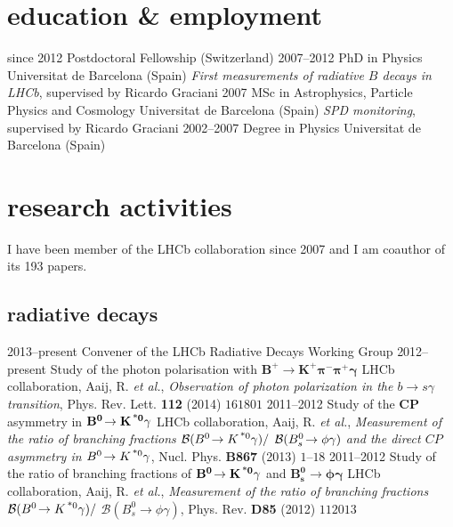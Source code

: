 \section{education \& employment}

  \cventry
    {since 2012}
    {Postdoctoral Fellowship}
    {\epfl(Switzerland)}
    {}
  \cventry
    {2007--2012}
    {PhD in Physics}
    {Universitat de Barcelona (Spain)}
    {\emph{First measurements of radiative $B$ decays in LHCb}, supervised by Ricardo Graciani}
  \cventry
    {2007}
    {MSc in Astrophysics, Particle Physics and Cosmology}
    {Universitat de Barcelona (Spain)}
    {\emph{SPD monitoring}, supervised by Ricardo Graciani}
  \cventry
    {2002--2007}
    {Degree in Physics}
    {Universitat de Barcelona (Spain)}
    {}

\section{research activities}
I have been member of the LHCb collaboration since 2007 and I am coauthor of its 193 papers.


\subsection{radiative decays}
    \cventry
    {2013--present}
    {Convener of the LHCb Radiative Decays Working Group}
    {}
    {}
    \cventry
    {2012--present}
    {Study of the photon polarisation with $\mathbf{B^+\!\to K^+\pi^-\pi^+\gamma}$}
    {}
    {LHCb collaboration, Aaij, R. \textit{et al.}, \textit{Observation of photon polarization in the $b \to s\gamma$ transition}, Phys. Rev. Lett. \textbf{112} (2014) $161801$}
    \cventry
    {2011--2012}
    {Study of the $\mathbf{CP}$ asymmetry in $\mathbf{B^0\!\to K^{\text{\,*}0}\gamma}$}
    {}
    {LHCb collaboration, Aaij, R. \textit{et al.}, \textit{Measurement of the ratio of branching fractions ${\cal B}(B^0\!\to K^{\text{\,*}0} \gamma) /$ ${\cal B}(B^0_s\!\to \phi \gamma)$ and the direct $CP$ asymmetry in $B^0\!\to K^{\text{\,*}0} \gamma$}, Nucl. Phys. \textbf{B867} (2013) $1$--$18$}
    \cventry
    {2011--2012}
    {Study of the ratio of branching fractions of $\mathbf{B^0\!\to K^{\text{\,*}0}\gamma}$ and $\mathbf{B^0_s\!\to \phi\gamma}$}
    {}
    {LHCb collaboration, Aaij, R. \textit{et al.}, \textit{Measurement of the ratio of branching fractions $\mathcal{B}(B^0\!\to K^{\text{\,*}0}\gamma)/$ $\mathcal{B}(B_s^0\to\phi\gamma)$}, Phys. Rev. \textbf{D85} (2012) $112013$}

